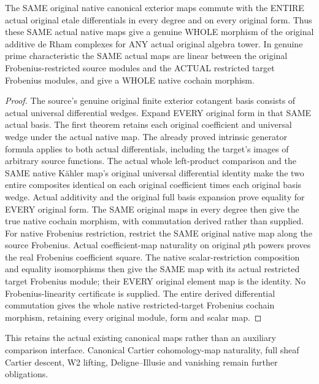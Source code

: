 \begin{theorem}
\label{thm:cartier-native-canonical-differential-naturality}
\leanok
The SAME original native canonical exterior maps commute with the ENTIRE
actual original etale differentials in every degree and on every original
form. Thus these SAME actual native maps give a genuine WHOLE morphism of
the original additive de Rham complexes for ANY actual original algebra tower.
In genuine prime characteristic the SAME actual maps are linear between
the original Frobenius-restricted source modules and the ACTUAL restricted
target Frobenius modules, and give a WHOLE native cochain morphism.
\end{theorem}
\begin{proof}
The source's genuine original finite exterior cotangent basis consists of
actual universal differential wedges. Expand EVERY original form in that
SAME actual basis. The first theorem retains each original coefficient and
universal wedge under the actual native map.
The already proved intrinsic generator formula applies to both actual
differentials, including the target's images of arbitrary source functions.
The actual whole left-product comparison and the SAME native K\"ahler map's
original universal differential identity make the two entire composites
identical on each original coefficient times each original basis wedge.
Actual additivity and the original full basis expansion prove equality for
EVERY original form. The SAME original maps in every degree then give the
true native cochain morphism, with commutation derived rather than supplied.
For native Frobenius restriction, restrict the SAME original native map
along the source Frobenius. Actual coefficient-map naturality on original
$p$th powers proves the real Frobenius coefficient square. The native
scalar-restriction composition and equality isomorphisms then give the SAME
map with its actual restricted target Frobenius module; their EVERY original
element map is the identity. No Frobenius-linearity certificate is supplied.
The entire derived differential commutation gives the whole
native restricted-target Frobenius cochain morphism, retaining every original
module, form and scalar map.
\end{proof}

This retains the actual existing canonical maps rather than an auxiliary
comparison interface. Canonical Cartier cohomology-map naturality, full
sheaf Cartier descent, W2 lifting, Deligne--Illusie and vanishing remain
further obligations.
